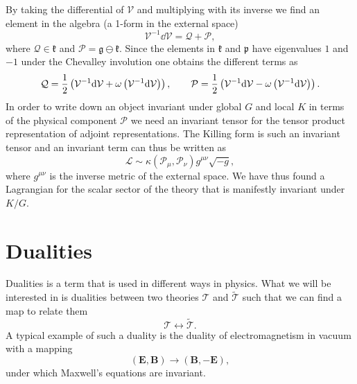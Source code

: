 By taking the differential of $\mathcal{V}$ and multiplying with its inverse we find an element in the algebra (a 1-form in the external space)
\begin{equation}
    \mathcal{V}^{-1}\dd \mathcal{V} = \mathcal{Q}+\mathcal{P},
\end{equation}
where $\mathcal{Q}\in\mathfrak{k}$ and $\mathcal{P}=\mathfrak{g}\ominus\mathfrak{k}$. Since the elements in $\mathfrak{k}$ and $\mathfrak{p}$ have eigenvalues $1$ and $-1$ under the Chevalley involution one obtains the different terms as
\begin{equation}
    \mathcal{Q} = \frac{1}{2}\left(\mathcal{V}^{-1}\mathrm{d} \mathcal{V}+\omega\left(\mathcal{V}^{-1}\mathrm{d} \mathcal{V}\right)\right),\\\qquad \mathcal{P} = \frac{1}{2}\left(\mathcal{V}^{-1}\mathrm{d} \mathcal{V}-\omega\left(\mathcal{V}^{-1}\mathrm{d} \mathcal{V}\right)\right).
\end{equation}
In order to write down an object invariant under global $G$ and local $K$ in terms of the physical component $\mathcal{P}$ we need an invariant tensor for the tensor product representation of adjoint representations. The Killing form is such an invariant tensor and an invariant term can thus be written as 
\begin{equation}
    \mathcal{L} \sim \kappa(\mathcal{P}_\mu,\mathcal{P}_\nu)g^{\mu\nu}\sqrt{-g},
\end{equation}
where $g^{\mu\nu}$ is the inverse metric of the external space. We have thus found a Lagrangian for the scalar sector of the theory that is manifestly invariant under $K/G$. 


\section{Dualities}\label{sec:Dualities}
Dualities is a term that is used in different ways in physics. What we will be interested in is dualities between two theories $\mathscr{T}$ and $\tilde{\mathscr{T}}$ such that we can find a map to relate them 
\begin{equation}
    \mathscr{T} \leftrightarrow \mathscr{\tilde{T}}.
\end{equation}
A typical example of such a duality is the duality of electromagnetism in vacuum with a mapping 
\begin{equation}
    \left(\mathbf{E},\mathbf{B}\right) \to \left(\mathbf{B},-\mathbf{E}\right),
\end{equation}
under which Maxwell's equations are invariant. 

